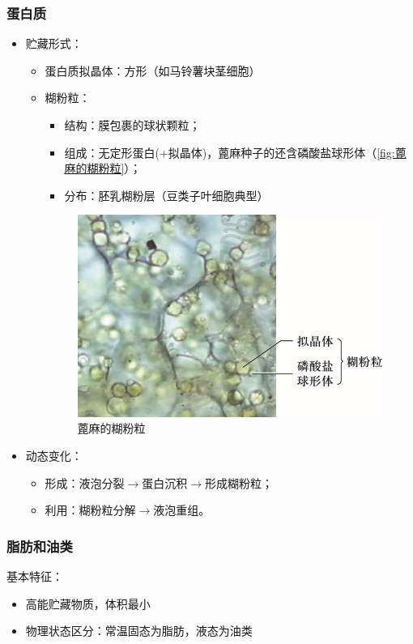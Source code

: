 	 \subsubsection{蛋白质}
	 \begin{itemize}
	 	\item 贮藏形式：
	 	\begin{itemize}
	 		\item 蛋白质拟晶体：方形（如马铃薯块茎细胞）
	 		\item 糊粉粒：
	 		\begin{itemize}
	 			\item 结构：膜包裹的球状颗粒；
	 			\item 组成：无定形蛋白(+拟晶体)，蓖麻种子的还含磷酸盐球形体（\autoref{fig:蓖麻的糊粉粒}）；
	 			\item 分布：胚乳糊粉层（豆类子叶细胞典型）
	 		\end{itemize}
	 		
	 		\begin{figure}[htbp]
	 			\centering
	 			\includegraphics[width=0.5\linewidth]{Pics/蓖麻的磷酸盐球形体}
	 			\caption{蓖麻的糊粉粒}
	 			\label{fig:蓖麻的糊粉粒}
	 		\end{figure}
	 		
	 	\end{itemize}
	 	\item 动态变化：
	 	\begin{itemize}
	 		\item 形成：液泡分裂$\longrightarrow$蛋白沉积$\longrightarrow$形成糊粉粒；
	 		\item 利用：糊粉粒分解$\longrightarrow$液泡重组。
	 	\end{itemize}
	 \end{itemize}
	 
	 \subsubsection{脂肪和油类}
		基本特征：
	 	\begin{itemize}
	 		\item 高能贮藏物质，体积最小
	 		\item 物理状态区分：常温固态为脂肪，液态为油类
	 	\end{itemize}
	 	
